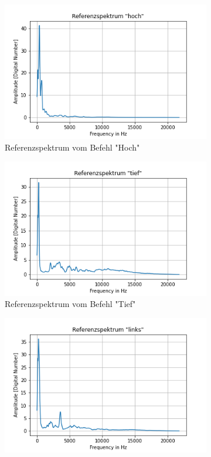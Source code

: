 \documentclass[12pt, oneside, a4paper, \docLanguage]{report}
\begin{document}
\begin{figure}[H]
\centering
	\begin{subfigure}{.5\textwidth}
  		\centering
 		 \includegraphics[width=.95\linewidth]{media/ReferenzspektrumHoch.png}
  		\caption{Referenzspektrum vom Befehl "Hoch"}
 		 \label{fig:VERSUCH_2_sub5}
	\end{subfigure}%
	\begin{subfigure}{.5\textwidth}
  		\centering
 		 \includegraphics[width=.95\linewidth]{media/ReferenzspektrumTief.png}
  		\caption{Referenzspektrum vom Befehl "Tief"}
  		\label{fig:VERSUCH_2_sub6}
	\end{subfigure}
	\begin{subfigure}{.5\textwidth}
  		\centering
 		 \includegraphics[width=.95\linewidth]{media/ReferenzspektrumLinks.png}

\end{subfigure}
\end{figure}
\end{document}
